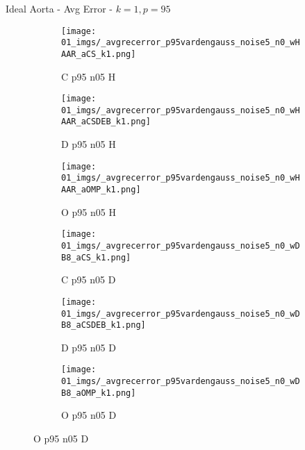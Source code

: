 \begin{frame}{Ideal Aorta - Avg Error - $k=1,p=95$}{}
\begin{figure}
\begin{subfigure}{0.13\textwidth}
\texttt{[image: 01\_imgs/\_avgrecerror\_p95vardengauss\_noise5\_n0\_wHAAR\_aCS\_k1.png]}
\caption*{\tiny C p95 n05 H}
\end{subfigure}
\begin{subfigure}{0.13\textwidth}
\texttt{[image: 01\_imgs/\_avgrecerror\_p95vardengauss\_noise5\_n0\_wHAAR\_aCSDEB\_k1.png]}
\caption*{\tiny D p95 n05 H}
\end{subfigure}
\begin{subfigure}{0.13\textwidth}
\texttt{[image: 01\_imgs/\_avgrecerror\_p95vardengauss\_noise5\_n0\_wHAAR\_aOMP\_k1.png]}
\caption*{\tiny O p95 n05 H}
\end{subfigure}
\begin{subfigure}{0.13\textwidth}
\texttt{[image: 01\_imgs/\_avgrecerror\_p95vardengauss\_noise5\_n0\_wDB8\_aCS\_k1.png]}
\caption*{\tiny C p95 n05 D}
\end{subfigure}
\begin{subfigure}{0.13\textwidth}
\texttt{[image: 01\_imgs/\_avgrecerror\_p95vardengauss\_noise5\_n0\_wDB8\_aCSDEB\_k1.png]}
\caption*{\tiny D p95 n05 D}
\end{subfigure}
\begin{subfigure}{0.13\textwidth}
\texttt{[image: 01\_imgs/\_avgrecerror\_p95vardengauss\_noise5\_n0\_wDB8\_aOMP\_k1.png]}
\caption*{\tiny O p95 n05 D}
\end{subfigure}

\vspace{5pt}


\end{figure}
\end{frame}
